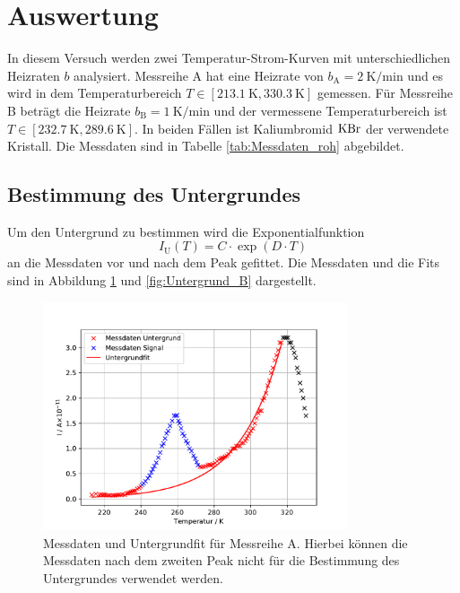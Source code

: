 \section{Auswertung}
\label{sec:auswertung}
In diesem Versuch werden zwei Temperatur-Strom-Kurven mit unterschiedlichen Heizraten $b$ analysiert.
Messreihe A hat eine Heizrate von $b_{\text{A}}=\SI{2}{\kelvin\per\minute}$ und es wird in dem Temperaturbereich
$T\in\left[\SI{213.1}{\kelvin},\SI{330.3}{\kelvin}\right]$ gemessen. Für Messreihe B beträgt die Heizrate
$b_{\text{B}}=\SI{1}{\kelvin\per\minute}$ und der vermessene Temperaturbereich ist $T\in\left[\SI{232.7}{\kelvin},\SI{289.6}{\kelvin}\right]$.
In beiden Fällen ist Kaliumbromid $\ce{KBr}$ der verwendete Kristall. Die Messdaten sind in Tabelle \ref{tab:Messdaten_roh}
abgebildet. 
\subsection{Bestimmung des Untergrundes}
Um den Untergrund zu bestimmen wird die Exponentialfunktion
\begin{equation}
    I_{\text{U}}(T) = C\cdot\exp\left(D\cdot  T\right)
\end{equation}
an die Messdaten vor und nach dem Peak gefittet.
Die Messdaten und die Fits sind in Abbildung \ref{fig:Untergrund_A} und \ref{fig:Untergrund_B} dargestellt.
\FloatBarrier
\begin{figure}
    \centering
    \includegraphics[width =0.8\textwidth, keepaspectratio]{figure/Untergrund_A.pdf}
    \caption{Messdaten und Untergrundfit für Messreihe A. Hierbei können die Messdaten nach dem zweiten Peak nicht für die 
    Bestimmung des Untergrundes verwendet werden.}
    \label{fig:Untergrund_A}
\end{figure}
